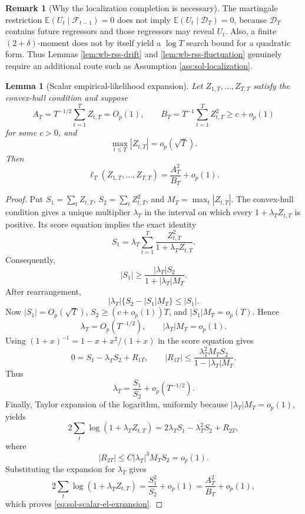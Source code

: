 \documentclass[12pt]{article}
\numberwithin{equation}{section}
\newtheorem{lemma}{Lemma}
\theoremstyle{definition}
\newtheorem{remark}{Remark}
\newcommand{\E}{\mathbb E}
\begin{document}
\begin{remark}[Why the localization completion is necessary]
The martingale restriction
\(\E(U_t\mid\mathcal F_{t-1})=0\) does not imply
\(\E(U_t\mid\mathcal D_T)=0\), because \(\mathcal D_T\) contains future
regressors and those regressors may reveal \(U_t\).  Also, a finite
\((2+\delta)\)-moment does not by itself yield a \(\log T\) search bound for a
quadratic form.  Thus Lemmas \ref{lem:wb-rss-drift} and
\ref{lem:wb-rss-fluctuation} genuinely require an additional route such as
Assumption \ref{ass:sol-localization}.
\end{remark}

\begin{lemma}[Scalar empirical-likelihood expansion]
\label{lem:sol-scalar-el}
Let \(Z_{1,T},\ldots,Z_{T,T}\) satisfy the convex-hull condition and suppose
\[
    A_T=T^{-1/2}\sum_{t=1}^TZ_{t,T}=O_p(1),
    \qquad
    B_T=T^{-1}\sum_{t=1}^TZ_{t,T}^2\geq c+o_p(1)
\]
for some \(c>0\), and
\[
    \max_{t\leq T}|Z_{t,T}|=o_p(\sqrt T).
\]
Then
\begin{equation}
    \ell_T(Z_{1,T},\ldots,Z_{T,T})
    =\frac{A_T^2}{B_T}+o_p(1).
    \label{eq:sol-scalar-el-expansion}
\end{equation}
\end{lemma}

\begin{proof}
Put
\(S_1=\sum_tZ_{t,T}\), \(S_2=\sum_tZ_{t,T}^2\), and
\(M_T=\max_t|Z_{t,T}|\).  The convex-hull condition gives a unique multiplier
\(\lambda_T\) in the interval on which every \(1+\lambda_TZ_{t,T}\) is
positive.  Its score equation implies the exact identity
\[
    S_1
    =\lambda_T\sum_{t=1}^T
      \frac{Z_{t,T}^2}{1+\lambda_TZ_{t,T}}.
\]
Consequently,
\[
    |S_1|
    \geq
    \frac{|\lambda_T|S_2}{1+|\lambda_T|M_T}.
\]
After rearrangement,
\[
    |\lambda_T|\{S_2-|S_1|M_T\}\leq |S_1|.
\]
Now \(|S_1|=O_p(\sqrt T)\), \(S_2\geq(c+o_p(1))T\), and
\(|S_1|M_T=o_p(T)\).  Hence
\[
    \lambda_T=O_p(T^{-1/2}),
    \qquad
    |\lambda_T|M_T=o_p(1).
\]
Using \((1+x)^{-1}=1-x+x^2/(1+x)\) in the score equation gives
\[
    0=S_1-\lambda_TS_2+R_{1T},
    \qquad
    |R_{1T}|
    \leq
    \frac{\lambda_T^2M_TS_2}{1-|\lambda_T|M_T}.
\]
Thus
\[
    \lambda_T=\frac{S_1}{S_2}+o_p(T^{-1/2}).
\]
Finally, Taylor expansion of the logarithm, uniformly because
\(|\lambda_T|M_T=o_p(1)\), yields
\[
    2\sum_t\log(1+\lambda_TZ_{t,T})
    =2\lambda_TS_1-\lambda_T^2S_2+R_{2T},
\]
where
\[
    |R_{2T}|
    \leq C|\lambda_T|^3M_TS_2=o_p(1).
\]
Substituting the expansion for \(\lambda_T\) gives
\[
    2\sum_t\log(1+\lambda_TZ_{t,T})
    =\frac{S_1^2}{S_2}+o_p(1)
    =\frac{A_T^2}{B_T}+o_p(1),
\]
which proves \eqref{eq:sol-scalar-el-expansion}.
\end{proof}
\end{document}
